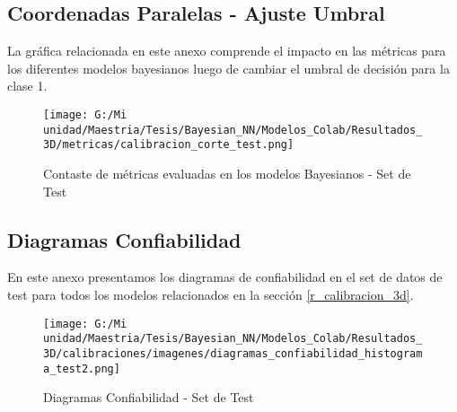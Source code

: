 \documentclass[10pt, oneside, a4paper]{article}
\newcommand{\aluno}{Juan Manuel Liscano Fierro}
\newcommand{\orientador}{Hector Javier Hortua Orjuela}
\begin{document}
	\subsection{Coordenadas Paralelas - Ajuste Umbral} \label{coordenadas_paralelas_umbral}
	
		La gráfica relacionada en este anexo comprende el impacto en las métricas para los diferentes modelos bayesianos luego de cambiar el umbral de decisión para la clase 1.
	
		\begin{figure}[H]
		\centering
		\texttt{[image: G:/Mi unidad/Maestria/Tesis/Bayesian\_NN/Modelos\_Colab/Resultados\_3D/metricas/calibracion\_corte\_test.png]}
		\caption{Contaste de métricas evaluadas en los modelos Bayesianos - Set de Test}
		\label{fig:calibracion_corte_test}
		\end{figure}

	\subsection{Diagramas Confiabilidad} \label{resultados_diagrama_conf}
	
	En este anexo presentamos los diagramas de confiabilidad en el set de datos de test para todos los modelos relacionados en la sección \ref{r_calibracion_3d}.
	
	\begin{figure}[H]
	\centering
	\texttt{[image: G:/Mi unidad/Maestria/Tesis/Bayesian\_NN/Modelos\_Colab/Resultados\_3D/calibraciones/imagenes/diagramas\_confiabilidad\_histograma\_test2.png]}
	\caption{Diagramas Confiabilidad - Set de Test}
	\label{fig:conf_todos2}
	\end{figure}	
	
\end{document}
